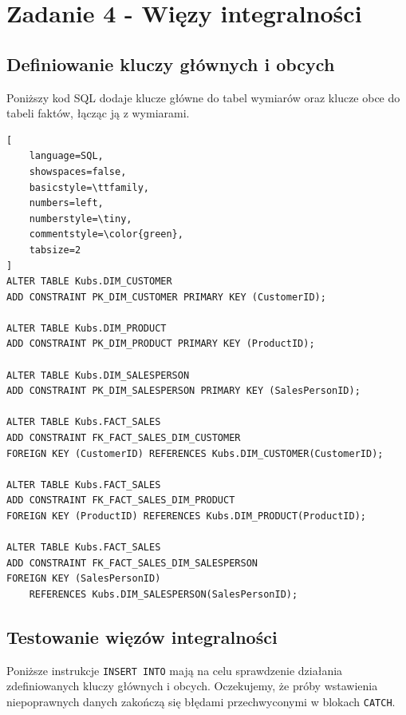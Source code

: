 \documentclass[a4paper,12pt]{article}
\begin{document}
\section{Zadanie 4 - Więzy integralności}

\subsection{Definiowanie kluczy głównych i obcych}

Poniższy kod SQL dodaje klucze główne do tabel wymiarów oraz klucze obce do tabeli faktów, łącząc ją z wymiarami.

    {\small
        \begin{lstlisting}[
    language=SQL,
    showspaces=false,
    basicstyle=\ttfamily,
    numbers=left,
    numberstyle=\tiny,
    commentstyle=\color{green},
    tabsize=2
]
ALTER TABLE Kubs.DIM_CUSTOMER
ADD CONSTRAINT PK_DIM_CUSTOMER PRIMARY KEY (CustomerID);

ALTER TABLE Kubs.DIM_PRODUCT
ADD CONSTRAINT PK_DIM_PRODUCT PRIMARY KEY (ProductID);

ALTER TABLE Kubs.DIM_SALESPERSON
ADD CONSTRAINT PK_DIM_SALESPERSON PRIMARY KEY (SalesPersonID);

ALTER TABLE Kubs.FACT_SALES
ADD CONSTRAINT FK_FACT_SALES_DIM_CUSTOMER
FOREIGN KEY (CustomerID) REFERENCES Kubs.DIM_CUSTOMER(CustomerID);

ALTER TABLE Kubs.FACT_SALES
ADD CONSTRAINT FK_FACT_SALES_DIM_PRODUCT
FOREIGN KEY (ProductID) REFERENCES Kubs.DIM_PRODUCT(ProductID);

ALTER TABLE Kubs.FACT_SALES
ADD CONSTRAINT FK_FACT_SALES_DIM_SALESPERSON
FOREIGN KEY (SalesPersonID) 
    REFERENCES Kubs.DIM_SALESPERSON(SalesPersonID);
\end{lstlisting}
    }

\subsection{Testowanie więzów integralności}

Poniższe instrukcje \texttt{INSERT INTO} mają na celu sprawdzenie działania zdefiniowanych kluczy głównych i obcych. Oczekujemy, że próby wstawienia niepoprawnych danych zakończą się błędami przechwyconymi w blokach \texttt{CATCH}.
\end{document}
